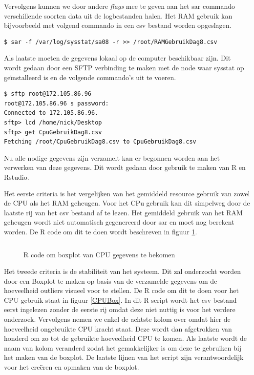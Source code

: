 Vervolgens kunnen we door andere \textit{flags} mee te geven aan het sar commando verschillende soorten data uit de logbestanden halen. Het RAM gebruik kan bijvoorbeeld met volgend commando in een csv bestand worden opgeslagen.

\begin{verbatim} 
$ sar -f /var/log/sysstat/sa08 -r >> /root/RAMGebruikDag8.csv
\end{verbatim}

Als laatste moeten de gegevens lokaal op de computer beschikbaar zijn. Dit wordt gedaan door een SFTP verbinding te maken met de node waar sysstat op geïnstalleerd is en de volgende commando's uit te voeren. 

\begin{verbatim} 
$ sftp root@172.105.86.96
root@172.105.86.96 s password:
Connected to 172.105.86.96.
sftp> lcd /home/nick/Desktop
sftp> get CpuGebruikDag8.csv
Fetching /root/CpuGebruikDag8.csv to CpuGebruikDag8.csv
\end{verbatim}

Nu alle nodige gegevens zijn verzamelt kan er begonnen worden aan het verwerken van deze gegevens. Dit wordt gedaan door gebruik te maken van R en Rstudio. 

Het eerste criteria is het vergelijken van het gemiddeld resource gebruik van zowel de CPU als het RAM geheugen. Voor het CPu gebruik kan dit simpelweg door de laatste rij van het csv bestand af te lezen. Het gemiddeld gebruik van het RAM geheugen wordt niet automatisch gegenereerd door sar en moet nog berekent worden. De R code om dit te doen wordt beschreven in figuur \ref{RAMAVG}.

\begin{figure}[h] 
	\inputminted[fontsize=\footnotesize,linenos]{R}{files/dataRAMAVG.R}
	\caption{R code om boxplot van CPU gegevens te bekomen}
	\label{RAMAVG}
\end{figure}
%

Het tweede criteria is de stabiliteit van het systeem. Dit zal onderzocht worden door een Boxplot te maken op basis van de verzamelde gegevens om de hoeveelheid outliers visueel voor te stellen. De R code om dit te doen voor het CPU gebruik staat in figuur \ref{CPUBox}. In dit R script wordt het csv bestand eerst ingelezen zonder de eerste rij omdat deze niet nuttig is voor het verdere onderzoek. Vervolgens nemen we enkel de achtste kolom over omdat hier de hoeveelheid ongebruikte CPU kracht staat. Deze wordt dan afgetrokken van honderd om zo tot de gebruikte hoeveelheid CPU te komen. Als laatste wordt de naam van kolom veranderd zodat het gemakkelijker is om deze te gebruiken bij het maken van de boxplot. De laatste lijnen van het script zijn verantwoordelijk voor het creëren en opmaken van de boxplot.

